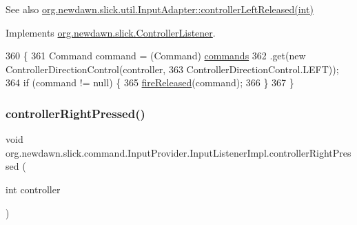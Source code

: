 \begin{DoxySeeAlso}{See also}
\mbox{\hyperlink{classorg_1_1newdawn_1_1slick_1_1util_1_1_input_adapter_af1419aca62539a39f52be90f64e778e3}{org.\+newdawn.\+slick.\+util.\+Input\+Adapter\+::controller\+Left\+Released(int)}} 
\end{DoxySeeAlso}


Implements \mbox{\hyperlink{interfaceorg_1_1newdawn_1_1slick_1_1_controller_listener_ad2f898f0efe21771a0d9568c454dea0d}{org.\+newdawn.\+slick.\+Controller\+Listener}}.


\begin{DoxyCode}
360                                                            \{
361             Command command = (Command) \mbox{\hyperlink{classorg_1_1newdawn_1_1slick_1_1command_1_1_input_provider_ab2bd0c08506a59bc7457d7a87cf873d2}{commands}}
362                     .\textcolor{keyword}{get}(\textcolor{keyword}{new} ControllerDirectionControl(controller,
363                             ControllerDirectionControl.LEFT));
364             \textcolor{keywordflow}{if} (command != null) \{
365                 \mbox{\hyperlink{classorg_1_1newdawn_1_1slick_1_1command_1_1_input_provider_afede03e3ab95cb0248635cf64de6874c}{fireReleased}}(command);
366             \}
367         \}
\end{DoxyCode}
\mbox{\label{classorg_1_1newdawn_1_1slick_1_1command_1_1_input_provider_1_1_input_listener_impl_abe27fbc28db92a0549e5e61fd8ce81f1}} 
\subsubsection{\texorpdfstring{controller\+Right\+Pressed()}{controllerRightPressed()}}
{\footnotesize\ttfamily void org.\+newdawn.\+slick.\+command.\+Input\+Provider.\+Input\+Listener\+Impl.\+controller\+Right\+Pressed (\begin{DoxyParamCaption}\item[{int}]{controller }\end{DoxyParamCaption})\hspace{0.3cm}{\ttfamily [inline]}}

